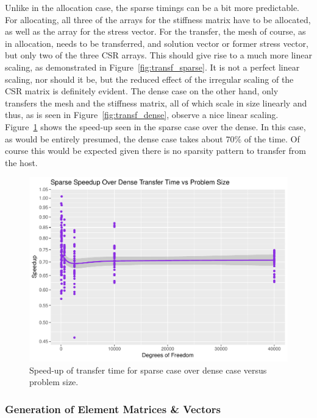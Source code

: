 Unlike in the allocation case, the sparse timings can be a bit more predictable. For allocating, all three of the arrays for the stiffness matrix have to be allocated, as well as the array for the stress vector. For the transfer, the mesh of course, as in allocation, needs to be transferred, and solution vector or former stress vector, but only two of the three CSR arrays. This should give rise to a much more linear scaling, as demonstrated in Figure~\ref{fig:transf_sparse}. It is not a perfect linear scaling, nor should it be, but the reduced effect of the irregular scaling of the CSR matrix is definitely evident. The dense case on the other hand, only transfers the mesh and the stiffness matrix, all of which scale in size linearly and thus, as is seen in Figure~\ref{fig:transf_dense}, observe a nice linear scaling. Figure~\ref{fig:transf_su} shows the speed-up seen in the sparse case over the dense. In this case, as would be entirely presumed, the dense case takes about 70\% of the time. Of course this would be expected given there is no sparsity pattern to transfer from the host.

\begin{figure}
	\centering
	\includegraphics[width = 0.48\linewidth]{Plots/transf_sparse_dense_speedup_vs_n}
	\caption{Speed-up of transfer time for sparse case over dense case versus problem size.}
	\label{fig:transf_su}
\end{figure}

\subsubsection{Generation of Element Matrices \& Vectors}

